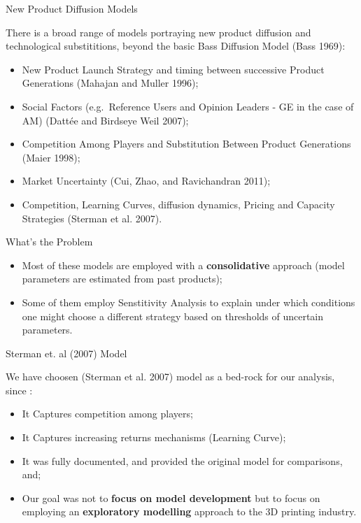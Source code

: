 \documentclass[12pt,ignorenonframetext,]{beamer}
\providecommand{\tightlist}{%
  \setlength{\itemsep}{0pt}\setlength{\parskip}{0pt}}
\begin{document}
\begin{frame}{New Product Diffusion Models}
\protect\hypertarget{new-product-diffusion-models}{}

There is a broad range of models portraying new product diffusion and
technological substititions, beyond the basic Bass Diffusion Model (Bass
1969):

\begin{itemize}
\tightlist
\item
  New Product Launch Strategy and timing between successive Product
  Generations (Mahajan and Muller 1996);
\item
  Social Factors (e.g.~Reference Users and Opinion Leaders - GE in the
  case of AM) (Dattée and Birdseye Weil 2007);
\item
  Competition Among Players and Substitution Between Product Generations
  (Maier 1998);
\item
  Market Uncertainty (Cui, Zhao, and Ravichandran 2011);
\item
  Competition, Learning Curves, diffusion dynamics, Pricing and Capacity
  Strategies (Sterman et al. 2007).
\end{itemize}

\end{frame}

\begin{frame}{What's the Problem}
\protect\hypertarget{whats-the-problem}{}

\begin{itemize}
\item
  Most of these models are employed with a \textbf{consolidative}
  approach (model parameters are estimated from past products);
\item
  Some of them employ Senstitivity Analysis to explain under which
  conditions one might choose a different strategy based on thresholds
  of uncertain parameters.
\end{itemize}

\end{frame}

\begin{frame}{Sterman et. al (2007) Model}
\protect\hypertarget{sterman-et.-al-2007-model}{}

We have choosen (Sterman et al. 2007) model as a bed-rock for our
analysis, since :

\begin{itemize}
\tightlist
\item
  It Captures competition among players;
\item
  It Captures increasing returns mechanisms (Learning Curve);
\item
  It was fully documented, and provided the original model for
  comparisons, and;
\item
  Our goal was not to \textbf{focus on model development} but to focus
  on employing an \textbf{exploratory modelling} approach to the 3D
  printing industry.
\end{itemize}

\end{frame}
\end{document}
